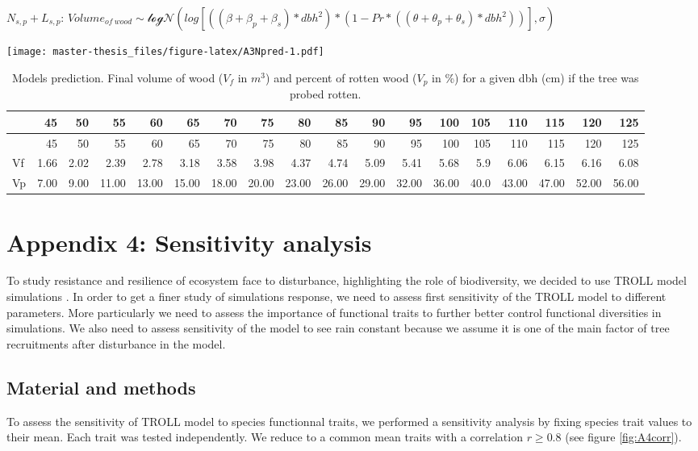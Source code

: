 \documentclass[12pt,]{article}
\let\oldsection\section
\renewcommand\section{\newpage\oldsection}
\theoremstyle{definition}
\theoremstyle{definition}
\theoremstyle{remark}
\begin{document}
\(N_{s,p} + L_{s,p}\):
\(Volume_{of~wood} \sim \mathcal{logN} (log[((\beta + \beta_p + \beta_s)*dbh^2)*(1 - Pr*((\theta + \theta_p + \theta_s) *dbh^2))], \sigma)\)

\texttt{[image: master-thesis\_files/figure-latex/A3Npred-1.pdf]}

\begin{longtable}[]{@{}lrrrrrrrrrrrrrrrrr@{}}
\caption{\label{tab:A3Ntab}Models prediction. Final volume of wood (\(V_f\)
in \(m^3\)) and percent of rotten wood (\(V_p\) in \%) for a given dbh
(cm) if the tree was probed rotten.}\tabularnewline
\toprule
& 45 & 50 & 55 & 60 & 65 & 70 & 75 & 80 & 85 & 90 & 95 & 100 & 105 & 110
& 115 & 120 & 125\tabularnewline
\midrule
\endfirsthead
\toprule
& 45 & 50 & 55 & 60 & 65 & 70 & 75 & 80 & 85 & 90 & 95 & 100 & 105 & 110
& 115 & 120 & 125\tabularnewline
\midrule
\endhead
Vf & 1.66 & 2.02 & 2.39 & 2.78 & 3.18 & 3.58 & 3.98 & 4.37 & 4.74 & 5.09
& 5.41 & 5.68 & 5.9 & 6.06 & 6.15 & 6.16 & 6.08\tabularnewline
Vp & 7.00 & 9.00 & 11.00 & 13.00 & 15.00 & 18.00 & 20.00 & 23.00 & 26.00
& 29.00 & 32.00 & 36.00 & 40.0 & 43.00 & 47.00 & 52.00 &
56.00\tabularnewline
\bottomrule
\end{longtable}

\hypertarget{appendix-4-sensitivity-analysis}{\section{Appendix 4:
Sensitivity analysis}\label{appendix-4-sensitivity-analysis}}

To study resistance and resilience of ecosystem face to disturbance,
highlighting the role of biodiversity, we decided to use TROLL model
simulations \citep{Chave1999}. In order to get a finer study of
simulations response, we need to assess first sensitivity of the TROLL
model to different parameters. More particularly we need to assess the
importance of functional traits to further better control functional
diversities in simulations. We also need to assess sensitivity of the
model to see rain constant because we assume it is one of the main
factor of tree recruitments after disturbance in the model.

\subsection{Material and methods}\label{material-and-methods-2}

To assess the sensitivity of TROLL model to species functionnal traits,
we performed a sensitivity analysis by fixing species trait values to
their mean. Each trait was tested independently. We reduce to a common
mean traits with a correlation \(r \geq 0.8\) (see figure
\ref{fig:A4corr}).
\end{document}
